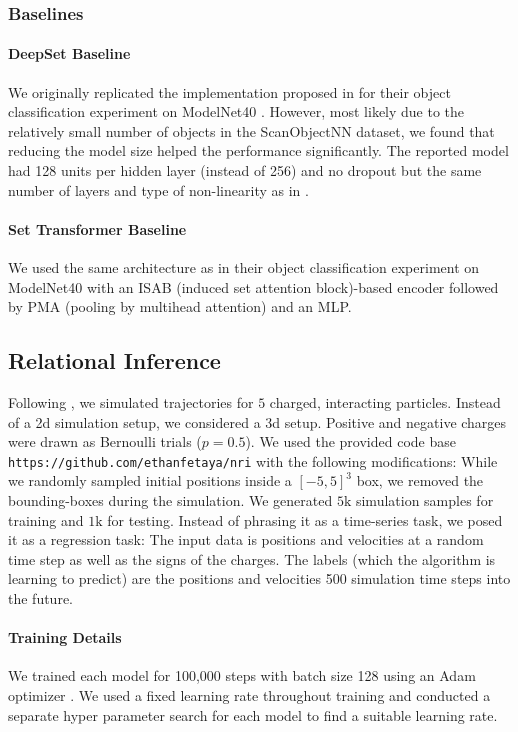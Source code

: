\subsubsection{Baselines}
\paragraph{DeepSet Baseline} We originally replicated the implementation proposed in \cite{Zaheer2017} for their object classification experiment on ModelNet40 \citep{modelnet40}. However, most likely due to the relatively small number of objects in the ScanObjectNN dataset, we found that reducing the model size helped the performance significantly. The reported model had 128 units per hidden layer (instead of 256) and no dropout but the same number of layers and type of non-linearity as in \cite{Zaheer2017}.

\paragraph{Set Transformer Baseline} We used the same architecture as \cite{SetTransformer} in their object classification experiment on ModelNet40 \citep{modelnet40} with an ISAB (induced set attention block)-based encoder followed by PMA (pooling by multihead attention) and an MLP.


\subsection{Relational Inference}
Following \citet{KipfFWWZ18}, we simulated trajectories for \(5\) charged, interacting particles. Instead of a 2d simulation setup, we considered a 3d setup. 
Positive and negative charges were drawn as Bernoulli trials (\(p=0.5\)).
We used the provided code base \texttt{https://github.com/ethanfetaya/nri} with the following modifications:
While we randomly sampled initial positions inside a \([-5,5]^3\) box, we removed the bounding-boxes during the simulation. We generated \(5\text{k}\) simulation samples for training and \(1\text{k}\) for testing. Instead of phrasing it as a time-series task, we posed it as a regression task: The input data is positions and velocities at a random time step as well as the signs of the charges. The labels (which the algorithm is learning to predict) are the positions and velocities 500 simulation time steps into the future.

\paragraph{Training Details}
We trained each model for 100,000 steps with batch size 128 using an Adam optimizer \cite{KingmaB14}. We used a fixed learning rate throughout training and conducted a separate hyper parameter search for each model to find a suitable learning rate.

